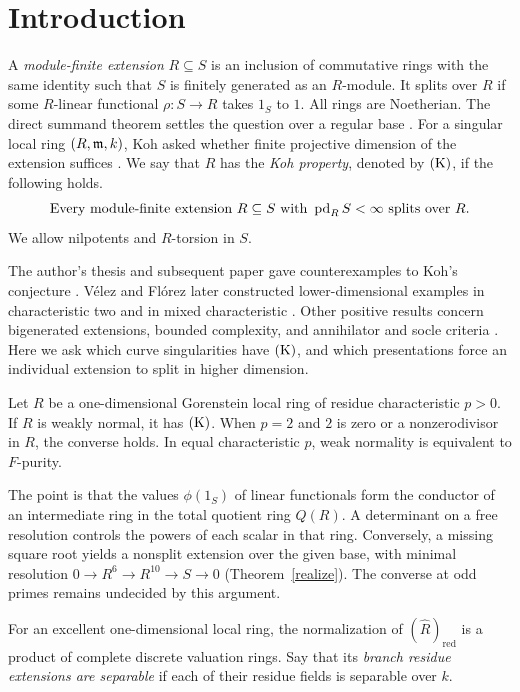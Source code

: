 \section{Introduction}
A \emph{module-finite extension} $R\subseteq S$ is an inclusion of commutative rings with the same identity such that $S$ is finitely generated as an $R$-module. It splits over $R$ if some $R$-linear functional $\rho:S\to R$ takes $1_S$ to $1$. All rings are Noetherian. The direct summand theorem settles the question over a regular base \cite{Andre}. For a singular local ring $(R,\mathfrak m,k)$, Koh asked whether finite projective dimension of the extension suffices \cite{Koh}. We say that $R$ has the \emph{Koh property}, denoted by $\mathrm{(K)}$, if the following holds.
\[
 \text{Every module-finite extension }R\subseteq S
 \text{ with }\operatorname{pd}_R S<\infty\text{ splits over }R.
\]
We allow nilpotents and $R$-torsion in $S$.

The author's thesis and subsequent paper gave counterexamples to Koh's conjecture \cite{V93,Velez}. V\'elez and Fl\'orez later constructed lower-dimensional examples in characteristic two and in mixed characteristic \cite{VF}. Other positive results concern bigenerated extensions, bounded complexity, and annihilator and socle criteria \cite{GGV2016,VG2020}. Here we ask which curve singularities have $\mathrm{(K)}$, and which presentations force an individual extension to split in higher dimension.

\begin{maina}
Let $R$ be a one-dimensional Gorenstein local ring of residue characteristic $p>0$. If $R$ is weakly normal, it has $\mathrm{(K)}$. When $p=2$ and $2$ is zero or a nonzerodivisor in $R$, the converse holds. In equal characteristic $p$, weak normality is equivalent to $F$-purity.
\end{maina}

The point is that the values $\phi(1_S)$ of linear functionals form the conductor of an intermediate ring in the total quotient ring $Q(R)$. A determinant on a free resolution controls the powers of each scalar in that ring. Conversely, a missing square root yields a nonsplit extension over the given base, with minimal resolution $0\to R^6\to R^{10}\to S\to0$ (Theorem~\ref{realize}). The converse at odd primes remains undecided by this argument.

For an excellent one-dimensional local ring, the normalization of $(\widehat R)_{\mathrm{red}}$ is a product of complete discrete valuation rings. Say that its \emph{branch residue extensions are separable} if each of their residue fields is separable over $k$.

